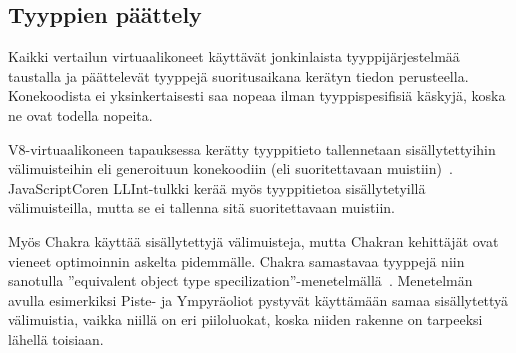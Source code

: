 \subsection{Tyyppien päättely}

Kaikki vertailun virtuaalikoneet käyttävät jonkinlaista tyyppijärjestelmää taustalla ja päättelevät tyyppejä suoritusaikana kerätyn tiedon perusteella. Konekoodista ei yksinkertaisesti saa nopeaa ilman tyyppispesifisiä käskyjä, koska ne ovat todella nopeita.

V8-virtuaalikoneen tapauksessa kerätty tyyppitieto tallennetaan sisällytettyihin välimuisteihin eli generoituun konekoodiin (eli suoritettavaan muistiin)~\cite{llint}. JavaScriptCoren LLInt-tulkki kerää myös tyyppitietoa sisällytetyillä välimuisteilla, mutta se ei tallenna sitä suoritettavaan muistiin.

Myös Chakra käyttää sisällytettyjä välimuisteja, mutta Chakran kehittäjät ovat vieneet optimoinnin askelta pidemmälle. Chakra samastavaa tyyppejä niin sanotulla ''equivalent object type specilization''-menetelmällä~\cite{chakra}. Menetelmän avulla esimerkiksi Piste- ja Ympyräoliot pystyvät käyttämään samaa sisällytettyä välimuistia, vaikka niillä on eri piiloluokat, koska niiden rakenne on tarpeeksi lähellä toisiaan.

\begin{comment}
\begin{itemize}
\item V8 inline cache KOODISSA
\item LLInt inlince cache MUISTISSA
\item \url{https://wiki.mozilla.org/TypeInference}
\item SpiderMonkey: Staattisen ja dynaamisen päättelyn yhdistelmä!
\item \url{https://trac.webkit.org/wiki/JavaScriptCore#TypeInference}
\item V8: hidden classes
\item Chakra: kohta 12 min (Polymorphic inline caches (equivalent object type specilization))
\end{itemize}
\end{comment}

